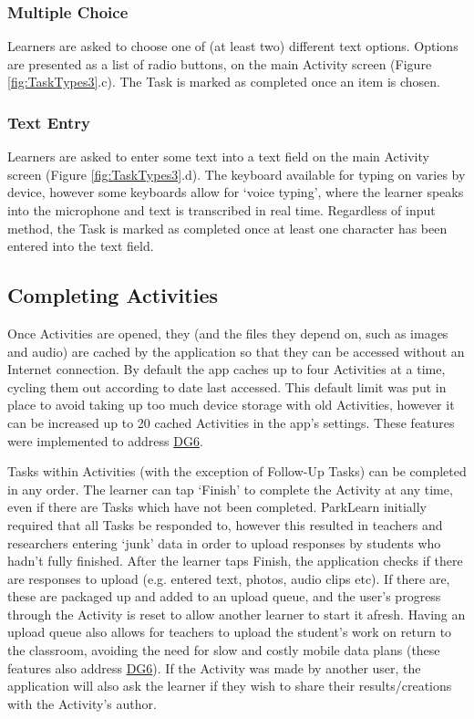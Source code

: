 \subsubsection*{Multiple Choice}
Learners are asked to choose one of (at least two) different text options. Options are presented as a list of radio buttons, on the main Activity screen (Figure \ref{fig:TaskTypes3}.c). The Task is marked as completed once an item is chosen.

\subsubsection*{Text Entry}
Learners are asked to enter some text into a text field on the main Activity screen (Figure \ref{fig:TaskTypes3}.d). The keyboard available for typing on varies by device, however some keyboards allow for `voice typing', where the learner speaks into the microphone and text is transcribed in real time. Regardless of input method, the Task is marked as completed once at least one character has been entered into the text field. 

\subsection{Completing Activities}

Once Activities are opened, they (and the files they depend on, such as images and audio) are cached by the application so that they can be accessed without an Internet connection. By default the app caches up to four Activities at a time, cycling them out according to date last accessed. This default limit was put in place to avoid taking up too much device storage with old Activities, however it can be increased up to 20 cached Activities in the app's settings. These features were implemented to address \hyperref[DG6]{DG6}.

Tasks within Activities (with the exception of Follow-Up Tasks) can be completed in any order. The learner can tap `Finish' to complete the Activity at any time, even if there are Tasks which have not been completed. ParkLearn initially required that all Tasks be responded to, however this resulted in teachers and researchers entering `junk' data in order to upload responses by students who hadn't fully finished. After the learner taps Finish, the application checks if there are responses to upload (e.g. entered text, photos, audio clips etc). If there are, these are packaged up and added to an upload queue, and the user's progress through the Activity is reset to allow another learner to start it afresh. Having an upload queue also allows for teachers to upload the student's work on return to the classroom, avoiding the need for slow and costly mobile data plans (these features also address \hyperref[DG6]{DG6}). If the Activity was made by another user, the application will also ask the learner if they wish to share their results/creations with the Activity's author.

